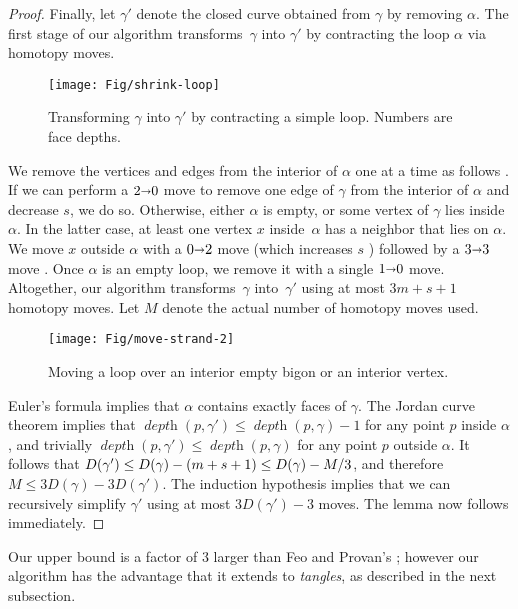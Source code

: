 \documentclass[11pt,twoside]{article}
\def\arcto{\mathord\shortrightarrow}
\def\arc#1#2{#1\arcto#2}
\def\Depth{\operatorname{\mathit{depth}}}
\let\EDIT\relax
\numberwithin{figure}{section}
\begin{document}
\begin{proof}
Finally, let $\gamma'$ denote the closed curve obtained from $\gamma$ by removing $\alpha$. The first stage of our algorithm transforms~$\gamma$ into $\gamma'$ by contracting the loop $\alpha$ via homotopy moves.  

\begin{figure}[ht]
\centering\texttt{[image: Fig/shrink-loop]}
\caption{Transforming $\gamma$ into $\gamma'$ by contracting a simple loop. Numbers are face depths.}
\label{F:curve-depth-contract}
\end{figure}

We remove the vertices and edges from the interior of $\alpha$ one at a time as follows \EDIT{(see Figure \ref{F:move-strand})}.
If we can perform a $\arc20$ move to remove one edge of $\gamma$ from the interior of $\alpha$ and decrease $s$, we do so.  Otherwise, either $\alpha$ is empty, or some vertex of $\gamma$ lies inside $\alpha$.  In the latter case, at least one vertex $x$  inside~$\alpha$ has a neighbor that lies on $\alpha$.  We move $x$ outside $\alpha$ with a $\arc02$ move (which increases $s$ \EDIT{by $1$}) followed by a $\arc33$ move \EDIT{(which decreases $m$ by $1$)}. 
Once $\alpha$ is an empty loop, we remove it with a single $\arc10$ move. Altogether, our algorithm transforms~$\gamma$ into~$\gamma'$ using at most $3m + s + 1$ homotopy moves.  Let $M$ denote the actual number of homotopy moves used.

\begin{figure}[ht]
\centering
\texttt{[image: Fig/move-strand-2]}
\caption{Moving a loop over an interior empty bigon or an interior vertex. }
\label{F:move-strand}
\end{figure}

Euler's formula implies that $\alpha$ contains exactly \EDIT{$m+s+1$} faces of $\gamma$.  The Jordan curve theorem implies that $\Depth(p, \gamma') \le \Depth(p, \gamma)-1$ for any point $p$ inside $\alpha$, and trivially $\Depth(p, \gamma') \le \Depth(p, \gamma)$ for any point $p$ outside $\alpha$. It follows that $D(\gamma') \le D(\gamma) - (\EDIT{m+s+1})  \le D(\gamma) - M/3$, and therefore $M \le 3D(\gamma) - 3 D(\gamma')$. The induction hypothesis implies that we can recursively simplify $\gamma'$ using at most $3D(\gamma') - 3$ moves. The lemma now follows immediately.
\end{proof}

Our upper bound is a factor of 3 larger than Feo and Provan's \cite{fp-dtert-93}; however our algorithm has the advantage that it extends to \emph{tangles}, as described in the next subsection.
\end{document}
